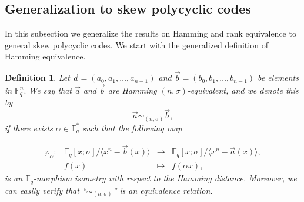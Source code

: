 \documentclass[12pt,paper]{article}
\newcommand{\hlc}[2][yellow]{ {\sethlcolor{#1} \hl{#2}} }
\theoremstyle{plain}
\newtheorem{definition}[theorem]{Definition}
\newcommand{\lleft}{\overleftarrow}
\begin{document}
\subsection{Generalization to skew polycyclic codes}
 In this subsection we generalize the results on {Hamming and rank}  equivalence to general skew  polycyclic codes. We start with the generalized definition of {Hamming} equivalence.

 
 
 \begin{definition}
Let $ \vec{a} = (a_0, a_1, \ldots, a_{n-1}) $ and $ \vec{b} = (b_0, b_1, \ldots, b_{n-1}) $ be elements in $\mathbb{F}_q^n .$
We say that $ \vec{a} $ and $ \vec{b} $ are {Hamming $ (n,\sigma)$-equivalent}, and we denote this by 
$$ \vec{a} \sim_{(n,\sigma)} \vec{b}, $$ 
if there exists \( \alpha \in \mathbb{F}_q^* \) such that the following map

  \begin{equation}
  	\begin{array}{cccc}
  	\varphi_{\alpha}:& \mathbb{F}_q[x;\sigma] /\langle x^n-\vec{b}(x) \rangle  &\longrightarrow & \mathbb{F}_q[x;\sigma] /\langle x^n-\vec{a}(x) \rangle, \\ 
  	& f(x) & \longmapsto &  f(\alpha x),
  	\end{array}
  	\end{equation} 
is an $\mathbb{F}_q$-morphism isometry with respect to the  Hamming distance.    Moreover, we can easily verify that ``$ \sim_{(n,\sigma)}$'' is an equivalence relation.
 \end{definition}
\end{document}
